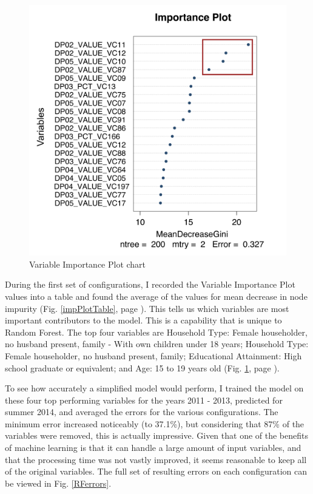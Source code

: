 \documentclass [a4paper,12 pt]{article}
\begin{document}
\begin{figure}
\begin{center}
\vspace{-290pt}
\centering
	\includegraphics[viewport=0 0 1018 992,clip,scale=0.5]{Figures/varImpPlotChart.png}
\caption{Variable Importance Plot chart}\label{impPlotChart}	
\vspace{10pt}
\end{center}
\end{figure}


During the first set of configurations, I recorded the Variable Importance Plot values into a table and found the average of the values for mean decrease in node impurity (Fig. \ref{impPlotTable}, page \pageref{impPlotTable}). This tells us which variables are most important contributors to the model. This is a capability that is unique to Random Forest. The top four variables are Household Type: Female householder, no husband present, family - With own children under 18 years; Household Type: Female householder, no husband present, family; Educational Attainment: High school graduate or equivalent; and Age: 15 to 19 years old (Fig.  \ref{impPlotChart}, page \pageref{impPlotChart}).




To see how accurately a simplified model would perform, I trained the model on these four top performing variables for the years 2011 - 2013, predicted for summer 2014, and averaged the errors for the various configurations. The minimum error increased noticeably (to 37.1\%), but considering that 87\% of the variables were removed, this is actually impressive. Given that one of the benefits of machine learning is that it can handle a large amount of input variables, and that the processing time was not vastly improved, it seems reasonable to keep all of the original variables. The full set of resulting errors on each configuration can be viewed in Fig. \ref{RFerrors}.
\end{document}
